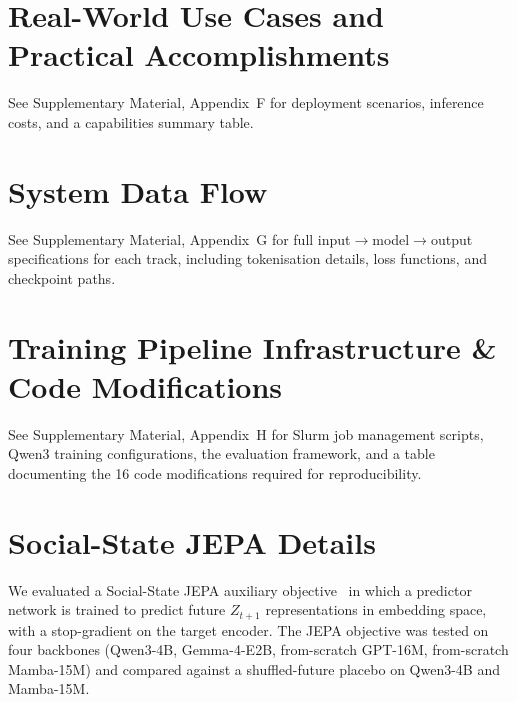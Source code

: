 \documentclass[11pt]{article}
\begin{document}
\section{Real-World Use Cases and Practical Accomplishments}
\label{app:usecases}

See Supplementary Material, Appendix~F for deployment scenarios, inference costs, and a capabilities summary table.

\section{System Data Flow}
\label{app:dataflow}

See Supplementary Material, Appendix~G for full input$\rightarrow$model$\rightarrow$output specifications for each track, including tokenisation details, loss functions, and checkpoint paths.

\section{Training Pipeline Infrastructure \& Code Modifications}
\label{app:infrastructure}

See Supplementary Material, Appendix~H for Slurm job management scripts, Qwen3 training configurations, the evaluation framework, and a table documenting the 16 code modifications required for reproducibility.


\section{Social-State JEPA Details}
\label{app:jepa}

We evaluated a Social-State JEPA auxiliary objective~\cite{lecun2022path,assran2023self} in which a predictor network is trained to predict future $Z_{t+1}$ representations in embedding space, with a stop-gradient on the target encoder.
The JEPA objective was tested on four backbones (Qwen3-4B, Gemma-4-E2B, from-scratch GPT-16M, from-scratch Mamba-15M) and compared against a shuffled-future placebo on Qwen3-4B and Mamba-15M.
\end{document}
